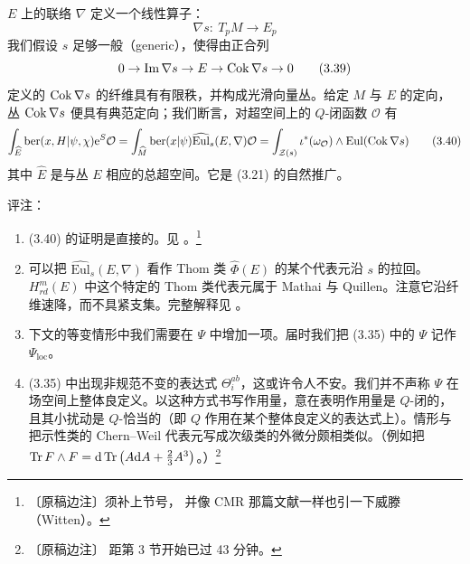 $E$ 上的联络 $\nabla$ 定义一个线性算子：
\begin{equation}
\nabla s:\ T_pM\to E_p
\tag{3.38}
\end{equation}
我们假设 $s$ 足够一般（generic），使得由正合列
\begin{equation}
0\to\operatorname{Im}\nabla s\to E\to\operatorname{Cok}\nabla s\to 0
\tag{3.39}
\end{equation}
定义的 $\operatorname{Cok}\nabla s$ 的纤维具有有限秩，并构成光滑向量丛。给定 $M$ 与 $E$ 的定向，
丛 $\operatorname{Cok}\nabla s$ 便具有典范定向；我们断言，对超空间上的 $Q$-闭函数 $\mathcal O$ 有
\begin{equation}
\int_{\widehat E}\mathrm{ber}(x,H|\psi,\chi)\mathrm{e}^{S}\mathcal O
= \int_{\widehat M}\mathrm{ber}(x|\psi)\widehat{\mathrm{Eul}}_s(E,\nabla)\mathcal O
= \int_{\mathcal Z(s)}\iota^{\ast}(\omega_{\mathcal O})
\wedge\mathrm{Eul}(\operatorname{Cok}\nabla s)
\tag{3.40}
\end{equation}
其中 $\widehat E$ 是与丛 $E$ 相应的总超空间。它是 (3.21) 的自然推广。

评注：

\begin{enumerate}
\item (3.40) 的证明是直接的。见 \cite{ref4}。\footnote{〔原稿边注〕须补上节号，
  并像 CMR 那篇文献一样也引一下威滕（Witten）。}
\item 可以把 $\widehat{\mathrm{Eul}}_s(E,\nabla)$ 看作 Thom 类 $\widehat\Phi(E)$
  的某个代表元沿 $s$ 的拉回。$H^m_{rd}(E)$ 中这个特定的 Thom 类代表元属于
  Mathai 与 Quillen。注意它沿纤维速降，而不具紧支集。完整解释见 \cite{ref4}。
\item 下文的等变情形中我们需要在 $\Psi$ 中增加一项。届时我们把 (3.35) 中的 $\Psi$
  记作 $\Psi_{\mathrm{loc}}$。
\item (3.35) 中出现非规范不变的表达式 $\Theta_i^{ab}$，这或许令人不安。我们并不声称
  $\Psi$ 在场空间上整体良定义。以这种方式书写作用量，意在表明作用量是 $Q$-闭的，
  且其小扰动是 $Q$-恰当的（即 $Q$ 作用在某个整体良定义的表达式上）。情形与把示性类的
  Chern--Weil 代表元写成次级类的外微分颇相类似。（例如把
  $\operatorname{Tr} F\wedge F=\mathrm{d}\operatorname{Tr}\big(A\mathrm{d} A+\frac{2}{3}A^3\big)$。）\footnote{〔原稿边注〕
  距第 3 节开始已过 43 分钟。}
\end{enumerate}

